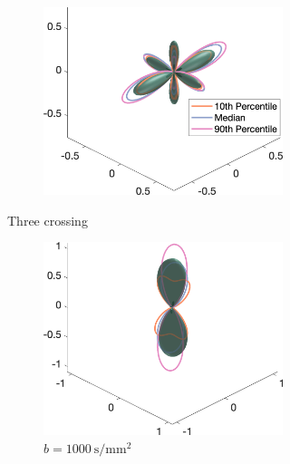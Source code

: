 \begin{figure}
\begin{subfigure}[]{\textwidth}
\begin{subfigure}[]{0.32\textwidth}
    \includegraphics[width=\textwidth]{figures/frf_experiment/threeperp_fod_3D_b_3000n_4}
  \end{subfigure}
  \caption{Three crossing}
  \end{subfigure}
  \begin{subfigure}[]{\textwidth}
  \begin{subfigure}[]{0.32\textwidth}
    \includegraphics[width=\textwidth]{figures/frf_experiment/EMfibres_fod_3D_b_1000n_4}
    \caption*{$b=\SI{1000}{\second\per\milli\metre\squared}$}
  \end{subfigure}
  ~
  \begin{subfigure}[]{0.32\textwidth}

\end{subfigure}
\end{subfigure}
\end{figure}
